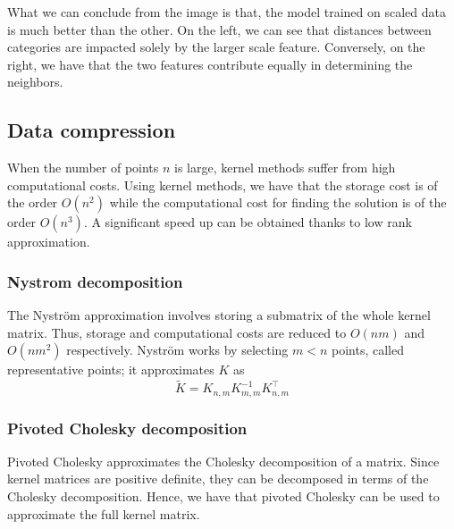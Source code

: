 What we can conclude from the image is that, the model trained on scaled data is much better than the other.
On the left, we can see that distances between categories are impacted solely by the larger scale feature. Conversely, on the right, we have that the two features contribute equally in determining the neighbors.

\subsection{Data compression}
When the number of points $n$ is large, kernel methods suffer from high computational costs. 
Using kernel methods, we have that the storage cost is of the order $O(n^2)$ while the computational cost for finding the solution is of the order $O(n^3)$.
A significant speed up can be obtained thanks to low rank approximation.


\subsubsection{Nystrom decomposition}
The Nyström approximation involves storing a submatrix of the whole kernel matrix. Thus, storage and computational costs are reduced to $O(nm)$ and $O(nm^2)$ respectively.
Nyström works by selecting $m<n$ points, called representative points; it approximates $K$ as
\begin{equation}
    \tilde {K}=K_{n,m} K_{m,m}^{-1}K_{n,m}^\intercal
\end{equation}


\subsubsection{Pivoted Cholesky decomposition}
Pivoted Cholesky approximates the Cholesky decomposition of a matrix. Since kernel matrices are positive definite, they can be decomposed in terms of the Cholesky decomposition. Hence, we have that pivoted Cholesky can be used to approximate the full kernel matrix.


\newpage
